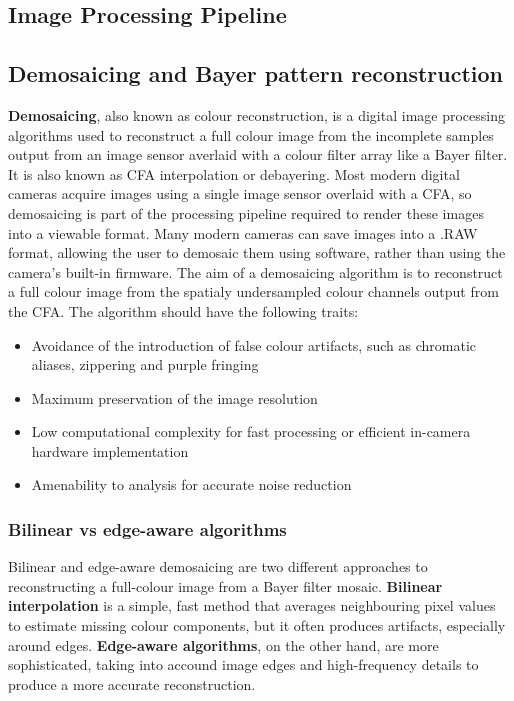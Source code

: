\documentclass[10pt]{article}
\begin{document}
\begin{multicols}{2}
\section{Image Processing Pipeline}

\subsection{Demosaicing and Bayer pattern reconstruction}
\textbf{Demosaicing}, also known as colour reconstruction, is a digital image processing algorithms used to reconstruct a full colour image from the incomplete samples output from an image sensor averlaid with a colour filter array like a Bayer filter. It is also known as CFA interpolation or debayering.
\newline \newline
Most modern digital cameras acquire images using a single image sensor overlaid with a CFA, so demosaicing is part of the processing pipeline required to render these images into a viewable format. Many modern cameras can save images into a .RAW format, allowing the user to demosaic them using software, rather than using the camera's built-in firmware.
\newline \newline
The aim of a demosaicing algorithm is to reconstruct a full colour image from the spatialy undersampled colour channels output from the CFA. The algorithm should have the following traits:
\begin{itemize}
    \item Avoidance of the introduction of false colour artifacts, such as chromatic aliases, zippering and purple fringing
    \item Maximum preservation of the image resolution
    \item Low computational complexity for fast processing or efficient in-camera hardware implementation
    \item Amenability to analysis for accurate noise reduction
\end{itemize}

\subsubsection{Bilinear vs edge-aware algorithms}
Bilinear and edge-aware demosaicing are two different approaches to reconstructing a full-colour image from a Bayer filter mosaic.
\newline \newline
\textbf{Bilinear interpolation} is a simple, fast method that averages neighbouring pixel values to estimate missing colour components, but it often produces artifacts, especially around edges.
\newline \newline
\textbf{Edge-aware algorithms}, on the other hand, are more sophisticated, taking into accound image edges and high-frequency details to produce a more accurate reconstruction.


\end{multicols}
\end{document}
